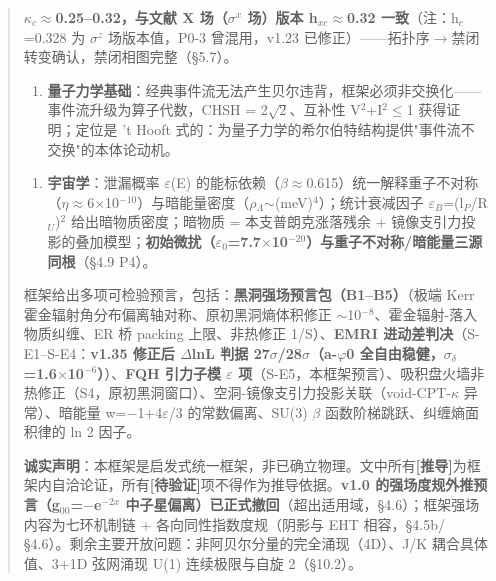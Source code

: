 \documentclass[12pt]{article}
\newcommand{\mtag}[1]{\textbf{[#1]}}
\newcommand{\up}[1]{\ensuremath{^{#1}}}
\newcommand{\down}[1]{\ensuremath{_{#1}}}
\begin{document}
\begin{abstract}
\begin{enumerate}
\textbf{\ensuremath{\kappa}\down{c}\ensuremath{\approx}0.25--0.32，与文献 X 场（\ensuremath{\sigma}\up{x} 场）版本 h\down{xc}\ensuremath{\approx}0.32 一致}（注：h\down{c}=0.328 为 \ensuremath{\sigma}\up{z} 场版本值，P0-3 曾混用，v1.23 已修正）------拓扑序\ensuremath{\to}禁闭转变确认，禁闭相图完整（\S{}5.7）。
\end{enumerate}

\begin{enumerate}
\item \textbf{量子力学基础}：经典事件流无法产生贝尔违背，框架必须非交换化------事件流升级为算子代数，CHSH = 2\ensuremath{\sqrt{2}}、互补性 V\up{2}+I\up{2}\ensuremath{\leq}1 获得证明；定位是 't Hooft 式的：为量子力学的希尔伯特结构提供"事件流不交换"的本体论动机。
\end{enumerate}

\begin{enumerate}
\item \textbf{宇宙学}：泄漏概率 \ensuremath{\varepsilon}(E) 的能标依赖（\ensuremath{\beta}\ensuremath{\approx}0.615）统一解释重子不对称（\ensuremath{\eta}\ensuremath{\approx}6\ensuremath{\times}10\up{-10}）与暗能量密度（\ensuremath{\rho}\down{\Lambda{}}\ensuremath{\sim}(meV)\up{4}）；统计衰减因子 \ensuremath{\varepsilon}\down{B}=(l\down{P}/R\down{U})\up{2} 给出暗物质密度；暗物质 = 本支普朗克涨落残余 + 镜像支引力投影的叠加模型；\textbf{初始微扰（\ensuremath{\varepsilon}\down{0}=7.7\ensuremath{\times}10\up{-20}）与重子不对称/暗能量三源同根}（\S{}4.9 P4）。
\end{enumerate}

框架给出多项可检验预言，包括：\textbf{黑洞强场预言包（B1--B5）}（极端 Kerr 霍金辐射角分布偏离轴对称、原初黑洞熵体积修正 \ensuremath{\sim}10\up{-8}、霍金辐射-落入物质纠缠、ER 桥 packing 上限、非热修正 1/S）、\textbf{EMRI 进动差判决}（S-E1--S-E4：\textbf{v1.35 修正后 \ensuremath{\Delta}lnL 判据 27\ensuremath{\sigma}/28\ensuremath{\sigma}（a-\ensuremath{\varphi}0 全自由稳健，\ensuremath{\sigma}\down{\delta{}}=1.6\ensuremath{\times}10\up{-6}）}）、\textbf{FQH 引力子模 \ensuremath{\varepsilon} 项}（S-E5，本框架预言）、吸积盘火墙非热修正（S4，原初黑洞窗口）、空洞-镜像支引力投影关联（void-CPT-\ensuremath{\kappa} 异常）、暗能量 w=\ensuremath{-}1+4\ensuremath{\varepsilon}/3 的常数偏离、SU(3) \ensuremath{\beta} 函数阶梯跳跃、纠缠熵面积律的 ln 2 因子。

\textbf{诚实声明}：本框架是启发式统一框架，非已确立物理。文中所有\mtag{推导}为框架内自洽论证，所有\mtag{待验证}项不得作为推导依据。\textbf{v1.0 的强场度规外推预言（g\down{00}=\ensuremath{-}e\up{-2x} 中子星偏离）已正式撤回}（超出适用域，\S{}4.6）；框架强场内容为七环机制链 + 各向同性指数度规（阴影与 EHT 相容，\S{}4.5b/\S{}4.6）。剩余主要开放问题：非阿贝尔分量的完全涌现（4D）、J/K 耦合具体值、3+1D 弦网涌现 U(1) 连续极限与自旋 2（\S{}10.2）。



\end{abstract}
\end{document}
